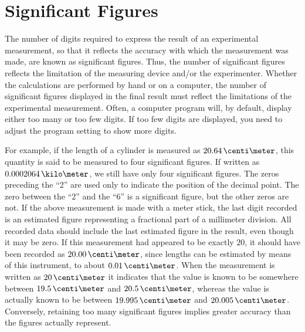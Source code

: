 \section{Significant Figures}
\label{sec:SigFig}

The number of digits required to express the result of an experimental measurement, so that it reflects the accuracy with which the measurement was made, are known as significant figures. Thus, the number of significant figures reflects the limitation of the measuring device and/or the experimenter. Whether the calculations are performed by hand or on a computer, the number of significant figures displayed in the final result must reflect the limitations of the experimental measurement. Often, a computer program will, by default, display either too many or too few digits. If too few digits are displayed, you need to adjust the program setting to show more digits.

For example, if the length of a cylinder is measured as $20.64\,\centi\meter$, this quantity is said to be measured to four significant figures.  If written as  $0.0002064\,\kilo\meter$, we still have only four significant figures. The zeros preceding the ``2'' are used only to indicate the position of the decimal point. The zero between the ``2'' and the ``6'' is a significant figure, but the other zeros are not.  If the above measurement is made with a meter stick, the last digit recorded is an estimated figure representing a fractional part of a millimeter division. All recorded data should include the last estimated figure in the result, even though it may be zero. If this measurement had appeared to be exactly $20$, it should have been recorded as $20.00\,\centi\meter$, since lengths can be estimated by means of this instrument, to about $0.01\,\centi\meter$. When the measurement is written as $20\,\centi\meter$ it indicates that the value is known to be somewhere between $19.5\,\centi\meter$ and $20.5\,\centi\meter$, whereas the value is actually known to be between $19.995\,\centi\meter$ and $20.005\,\centi\meter$.  Conversely, retaining too many significant figures implies greater accuracy than the figures actually represent.

